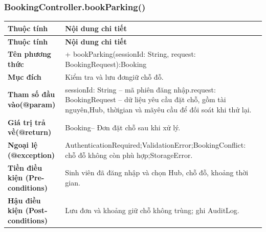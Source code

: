 \subsubsection{BookingController.bookParking()}
\begin{longtable}{|L{0.24\textwidth}|L{0.70\textwidth}|}
\hline
\textbf{Thuộc tính} & \textbf{Nội dung chi tiết} \\
\hline
\endfirsthead
\hline
\textbf{Thuộc tính} & \textbf{Nội dung chi tiết} \\
\hline
\endhead
\textbf{Tên phương thức} & + bookParking(sessionId: String, request: BookingRequest):\newline Booking \\
\hline
\textbf{Mục đích} & Kiểm tra và lưu đơngiữ chỗ đỗ. \\
\hline
\textbf{Tham số đầu vào}\newline \textbf{(@param)} & sessionId: String – mã phiên đăng nhập.\newline request: BookingRequest – dữ liệu yêu cầu đặt chỗ, gồm tài nguyên,\newline Hub, thờigian và mãyêu cầu để đối soát khi thử lại. \\
\hline
\textbf{Giá trị trả về(@return)} & Booking– Đơn đặt chỗ sau khi xử lý. \\
\hline
\textbf{Ngoại lệ (@exception)} & AuthenticationRequired;\newline ValidationError;\newline BookingConflict: chỗ đỗ không còn phù hợp;\newline StorageError. \\
\hline
\textbf{Tiền điều kiện (Pre-}\newline \textbf{conditions)} & Sinh viên đã đăng nhập và chọn Hub, chỗ đỗ, khoảng thời gian. \\
\hline
\textbf{Hậu điều kiện (Post-}\newline \textbf{conditions)} & Lưu đơn và khoảng giữ chỗ không trùng; ghi AuditLog. \\
\hline
\end{longtable}
\vspace{-0.5\baselineskip}
